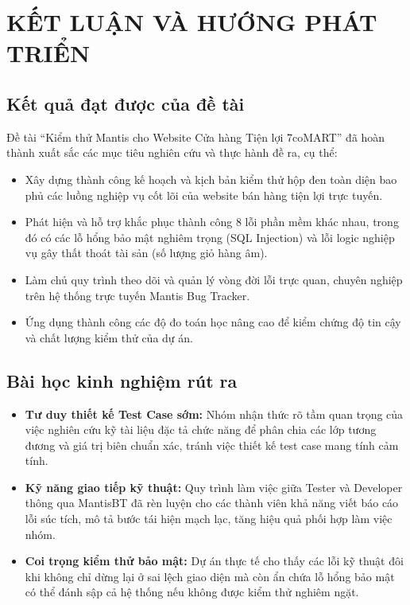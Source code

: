 \chapter{KẾT LUẬN VÀ HƯỚNG PHÁT TRIỂN}

\section{Kết quả đạt được của đề tài}
Đề tài ``Kiểm thử Mantis cho Website Cửa hàng Tiện lợi 7coMART'' đã hoàn thành xuất sắc các mục tiêu nghiên cứu và thực hành đề ra, cụ thể:
\begin{itemize}
    \item Xây dựng thành công kế hoạch và kịch bản kiểm thử hộp đen toàn diện bao phủ các luồng nghiệp vụ cốt lõi của website bán hàng tiện lợi trực tuyến.
    \item Phát hiện và hỗ trợ khắc phục thành công 8 lỗi phần mềm khác nhau, trong đó có các lỗ hổng bảo mật nghiêm trọng (SQL Injection) và lỗi logic nghiệp vụ gây thất thoát tài sản (số lượng giỏ hàng âm).
    \item Làm chủ quy trình theo dõi và quản lý vòng đời lỗi trực quan, chuyên nghiệp trên hệ thống trực tuyến Mantis Bug Tracker.
    \item Ứng dụng thành công các độ đo toán học nâng cao để kiểm chứng độ tin cậy và chất lượng kiểm thử của dự án.
\end{itemize}

\section{Bài học kinh nghiệm rút ra}
\begin{itemize}
    \item \textbf{Tư duy thiết kế Test Case sớm:} Nhóm nhận thức rõ tầm quan trọng của việc nghiên cứu kỹ tài liệu đặc tả chức năng để phân chia các lớp tương đương và giá trị biên chuẩn xác, tránh việc thiết kế test case mang tính cảm tính.
    \item \textbf{Kỹ năng giao tiếp kỹ thuật:} Quy trình làm việc giữa Tester và Developer thông qua MantisBT đã rèn luyện cho các thành viên khả năng viết báo cáo lỗi súc tích, mô tả bước tái hiện mạch lạc, tăng hiệu quả phối hợp làm việc nhóm.
    \item \textbf{Coi trọng kiểm thử bảo mật:} Dự án thực tế cho thấy các lỗi kỹ thuật đôi khi không chỉ dừng lại ở sai lệch giao diện mà còn ẩn chứa lỗ hổng bảo mật có thể đánh sập cả hệ thống nếu không được kiểm thử nghiêm ngặt.
\end{itemize}

